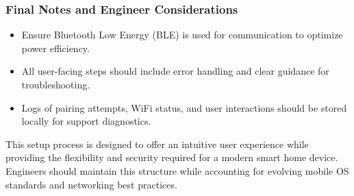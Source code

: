 \subsubsection{Final Notes and Engineer Considerations}

\begin{itemize}
    \item Ensure Bluetooth Low Energy (BLE) is used for communication to optimize power efficiency.
    \item All user-facing steps should include error handling and clear guidance for troubleshooting.
    \item Logs of pairing attempts, WiFi status, and user interactions should be stored locally for support diagnostics.
\end{itemize}

This setup process is designed to offer an intuitive user experience while providing the flexibility and security required for a modern smart home device. Engineers should maintain this structure while accounting for evolving mobile OS standards and networking best practices.
